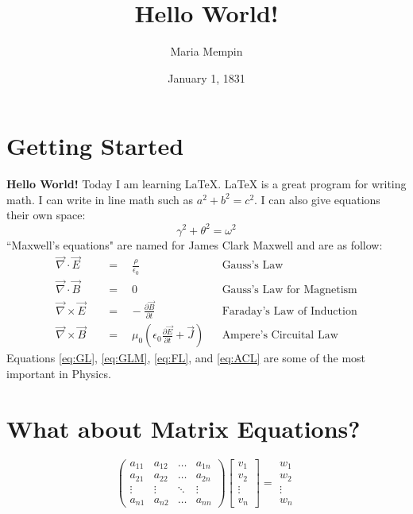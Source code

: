 \documentclass[12pt]{article}
\title{Hello World!}
\author{Maria Mempin}
\date{January 1, 1831}
\begin{document}
\maketitle    
\section{Getting Started}
\textbf{Hello World!} Today I am learning \LaTeX. \LaTeX{} is a great program for writing math.  I can write in line math such as $a^2 + b^2 = c^2$.   I can also give equations their own space: 
\begin{equation}
    \gamma^2 +\theta^2 = \omega^2
\end{equation}
``Maxwell's equations" are named for James Clark Maxwell and are as follow:
\begin{align}
    \vec{\nabla} \cdot \vec{E} \quad &=\quad\frac{\rho}{\epsilon_0} &&\text{Gauss's Law} \label{eq:GL}\\      
    \vec{\nabla} \cdot \vec{B} \quad &=\quad 0 &&\text{Gauss's Law for Magnetism} \label{eq:GLM}\\
    \vec{\nabla} \times \vec{E} \quad &=\hspace{10pt}-\frac{\partial{\vec{B}}}{\partial{t}} &&\text{Faraday's Law of Induction} \label{eq:FL}\\ 
    \vec{\nabla} \times \vec{B} \quad &=\quad \mu_0\left( \epsilon_0\frac{\partial{\vec{E}}}{\partial{t}}+\vec{J}\right) &&\text{Ampere's Circuital Law} \label{eq:ACL}
    \end{align}
    Equations \ref{eq:GL}, \ref{eq:GLM}, \ref{eq:FL}, and \ref{eq:ACL} are some of the most important in Physics.
    \section{What about Matrix Equations?}
    \begin{equation*}
        \begin{pmatrix}
        a_{11}&a_{12}&\dots&a_{1n}\\
        a_{21}&a_{22}&\dots&a_{2n}\\
        \vdots&\vdots&\ddots&\vdots\\
        a_{n1}&a_{n2}&\dots&a_{nn}
        \end{pmatrix}
        \begin{bmatrix}
        v_{1}\\
        v_{2}\\
        \vdots\\
        v_{n}
        \end{bmatrix}
        =
        \begin{matrix}
        w_{1}\\
        w_{2}\\
        \vdots\\
        w_{n}
        \end{matrix}
        \end{equation*}
\end{document}
